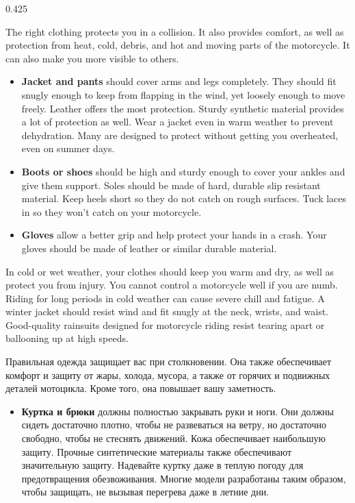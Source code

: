 \begin{langblock}{0.425} 
	\begin{eng}
	The right clothing protects you in a collision. It also provides comfort, as well as protection from heat, cold, debris, and hot and moving parts of the motorcycle. It can also make you more visible to others.
	\begin{itemize}
		\item \textbf{Jacket and pants} should cover arms and legs completely. They should fit snugly enough to keep from flapping in the wind, yet loosely enough to move freely. Leather offers the most protection. Sturdy synthetic material provides a lot of protection as well. Wear a jacket even in warm weather to prevent dehydration. Many are designed to protect without getting you overheated, even on summer days.
		\item \textbf{Boots or shoes} should be high and sturdy enough to cover your ankles and give them support. Soles should be made of hard, durable slip resistant material. Keep heels short so they do not catch on rough surfaces. Tuck laces in so they won't catch on your motorcycle.
		\item \textbf{Gloves} allow a better grip and help protect your hands in a crash. Your gloves should be made of leather or similar durable material.
	\end{itemize}
	In cold or wet weather, your clothes should keep you warm and dry, as well as protect you from injury. You cannot control a motorcycle well if you are numb. Riding for long periods in cold weather can cause severe chill and fatigue. A winter jacket should resist wind and fit snugly at the neck, wrists, and waist. Good-quality rainsuits designed for motorcycle riding resist tearing apart or ballooning up at high speeds.
	\end{eng}
	\begin{rus}
		Правильная одежда защищает вас при столкновении. Она также обеспечивает комфорт и защиту от жары, холода, мусора, а также от горячих и подвижных деталей мотоцикла. Кроме того, она повышает вашу заметность.
		\begin{itemize}[nosep]
			\item \textbf{Куртка и брюки} должны полностью закрывать руки и ноги. Они должны сидеть достаточно плотно, чтобы не развеваться на ветру, но достаточно свободно, чтобы не стеснять движений. Кожа обеспечивает наибольшую защиту. Прочные синтетические материалы также обеспечивают значительную защиту. Надевайте куртку даже в теплую погоду для предотвращения обезвоживания. Многие модели разработаны таким образом, чтобы защищать, не вызывая перегрева даже в летние дни.

\end{itemize}
\end{rus}
\end{langblock}
